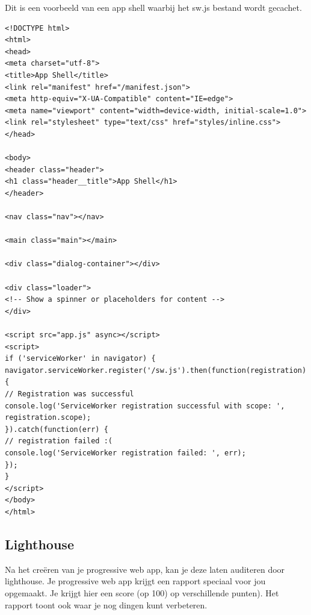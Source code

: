 Dit is een voorbeeld van een app shell waarbij het sw.js bestand wordt gecachet. 


\begin{lstlisting}
<!DOCTYPE html>
<html>
<head>
<meta charset="utf-8">
<title>App Shell</title>
<link rel="manifest" href="/manifest.json">
<meta http-equiv="X-UA-Compatible" content="IE=edge">
<meta name="viewport" content="width=device-width, initial-scale=1.0">
<link rel="stylesheet" type="text/css" href="styles/inline.css">
</head>

<body>
<header class="header">
<h1 class="header__title">App Shell</h1>
</header>

<nav class="nav"></nav>

<main class="main"></main>

<div class="dialog-container"></div>

<div class="loader">
<!-- Show a spinner or placeholders for content -->
</div>

<script src="app.js" async></script>
<script>
if ('serviceWorker' in navigator) {
navigator.serviceWorker.register('/sw.js').then(function(registration) {
// Registration was successful
console.log('ServiceWorker registration successful with scope: ', registration.scope);
}).catch(function(err) {
// registration failed :(
console.log('ServiceWorker registration failed: ', err);
});
}
</script>
</body>
</html>
\end{lstlisting}

\subsection{Lighthouse}
Na het creëren van je progressive web app, kan je deze laten auditeren door lighthouse. Je progressive web app krijgt een rapport speciaal voor jou opgemaakt. Je krijgt hier een score (op 100) op verschillende punten). Het rapport toont ook waar je nog dingen kunt verbeteren.



